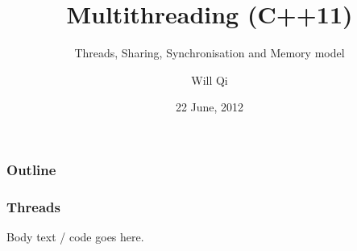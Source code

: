 \documentclass{beamer}
\title{Multithreading (C++11)}
\subtitle{Threads, Sharing, Synchronisation and Memory model}
\author{Will Qi}
\date{22 June, 2012}
\begin{document}
\maketitle

\begin{frame}
  \frametitle{Outline}
    \tableofcontents[part=1,pausesections]
\end{frame}

\begin{frame}
  \frametitle{Threads}
  Body text / code goes here.
\end{frame}
\end{document}
